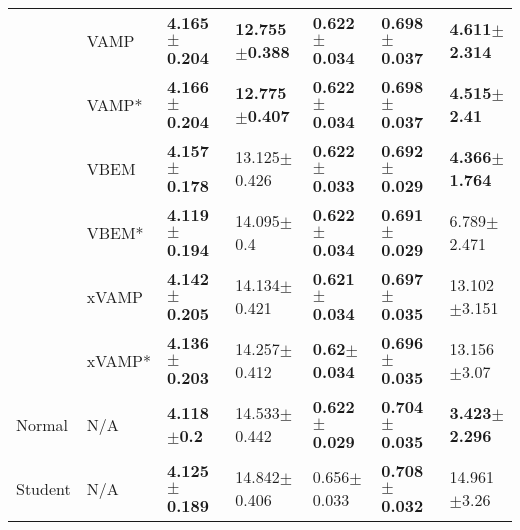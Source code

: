\begin{tabular}{lllllll}
        & VAMP &  \textbf{4.165$\pm$0.204} &  \textbf{12.755$\pm$0.388} &  \textbf{0.622$\pm$0.034} &  \textbf{0.698$\pm$0.037} &  \textbf{4.611$\pm$2.314} \\
        & VAMP* &  \textbf{4.166$\pm$0.204} &  \textbf{12.775$\pm$0.407} &  \textbf{0.622$\pm$0.034} &  \textbf{0.698$\pm$0.037} &   \textbf{4.515$\pm$2.41} \\
        & VBEM &  \textbf{4.157$\pm$0.178} &           13.125$\pm$0.426 &  \textbf{0.622$\pm$0.033} &  \textbf{0.692$\pm$0.029} &  \textbf{4.366$\pm$1.764} \\
        & VBEM* &  \textbf{4.119$\pm$0.194} &             14.095$\pm$0.4 &  \textbf{0.622$\pm$0.034} &  \textbf{0.691$\pm$0.029} &           6.789$\pm$2.471 \\
        & xVAMP &  \textbf{4.142$\pm$0.205} &           14.134$\pm$0.421 &  \textbf{0.621$\pm$0.034} &  \textbf{0.697$\pm$0.035} &          13.102$\pm$3.151 \\
        & xVAMP* &  \textbf{4.136$\pm$0.203} &           14.257$\pm$0.412 &   \textbf{0.62$\pm$0.034} &  \textbf{0.696$\pm$0.035} &           13.156$\pm$3.07 \\
Normal & N/A &    \textbf{4.118$\pm$0.2} &           14.533$\pm$0.442 &  \textbf{0.622$\pm$0.029} &  \textbf{0.704$\pm$0.035} &  \textbf{3.423$\pm$2.296} \\
Student & N/A &  \textbf{4.125$\pm$0.189} &           14.842$\pm$0.406 &           0.656$\pm$0.033 &  \textbf{0.708$\pm$0.032} &           14.961$\pm$3.26 \\
\bottomrule
\end{tabular}

